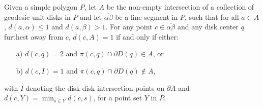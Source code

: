 \documentclass{llncs}
\begin{document}
\begin{lemma}
Given a  simple polygon $P$, let $A$ be the non-empty intersection of a collection of geodesic unit disks in $P$ and let $\overline{\alpha\beta}$  be a line-segment in $P$, such that for all $a \in A$, $d(a, \alpha) \leq 1$ and $d(a, \beta) > 1$.   For any point $c \in \overline{\alpha\beta}$ and any disk center $q$ furthest away from $c$, $d(c, A) = 1$ if and only if either:
\begin{enumerate}
\item[a)] $d(c, q) = 2$ and $\pi(c,q) \cap \partial D(q) \in A$, or
\item[b)] $d(c, I) = 1$ and $\pi(c, q)  \cap \partial D(q) \notin A$, 
\end{enumerate}
\label{Aint}
with $I$ denoting the disk-disk intersection points on $\partial A$ and $d(c, Y) = \min_{s \in Y} d(c,s)$, for a point set $Y$ in $P$. 
\end{lemma}
\end{document}
